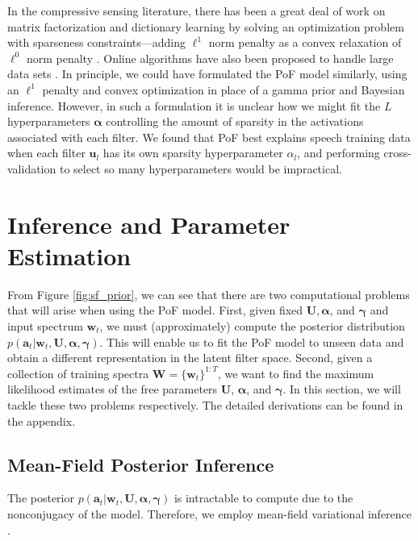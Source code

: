 \documentclass{article} %
\begin{document}
In the compressive sensing literature, there has been a great deal of
work on matrix factorization and dictionary learning by solving an
optimization problem with sparseness constraints---adding $\ell^1$
norm penalty as a convex relaxation of $\ell^0$ norm penalty
\cite{donoho2003optimally}. Online algorithms have also been proposed to
handle large data sets \cite{mairal2010online}. In principle, we could
have formulated the PoF model similarly, using an $\ell^1$ penalty and
convex optimization in place of a gamma prior and Bayesian inference.
However, in such a formulation it is unclear how we might fit the $L$
hyperparameters $\bm{\alpha}$ controlling the amount of sparsity in
the activations associated with each filter. We found that PoF best
explains speech training data when each filter $\bm{u}_l$ has its own
sparsity hyperparameter $\alpha_l$, and performing cross-validation to
select so many hyperparameters would be impractical.

\section{Inference and Parameter Estimation}
\label{sec:inference}
From Figure \ref{fig:sf_prior}, we can see that there are two computational problems that will arise when using the PoF model. First, given fixed $\mathbf{U}, \bm{\alpha}$, and $\bm{\gamma}$ and input spectrum $\bm{w}_t$, we must (approximately) compute the posterior distribution $p(\bm{a}_t | \bm{w}_t, \mathbf{U}, \bm{\alpha}, \bm{\gamma})$. This will enable us to fit the PoF model to unseen data and obtain a different representation in the latent filter space. Second, given a collection of training spectra $\mathbf{W} = \{\bm{w}_t\}^{1:T}$, we want to find the maximum likelihood estimates of the free parameters $\mathbf{U}$, $\bm{\alpha}$, and $\bm{\gamma}$. In this section, we will tackle these two problems respectively. The detailed derivations can be found in the appendix.  

\subsection{Mean-Field Posterior Inference}\label{sec:e-step}
The posterior $p(\bm{a}_t | \bm{w}_t, \mathbf{U}, \bm{\alpha}, \bm{\gamma})$ is intractable to compute due to the nonconjugacy of the model. Therefore, we employ mean-field variational inference \cite{jordan1999introduction}.
\end{document}
